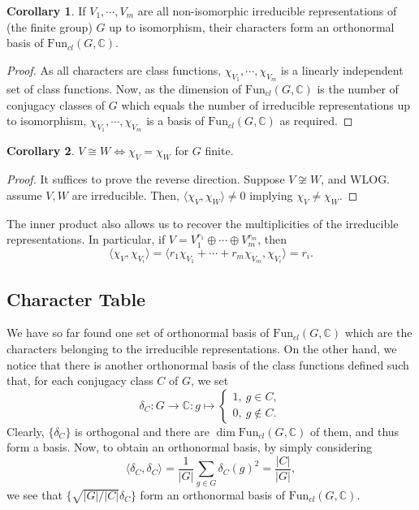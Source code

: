 \documentclass[]{article}
\theoremstyle{definition}
\newtheorem{corollary}{Corollary}[theorem]
\theoremstyle{definition}
\begin{document}
\begin{corollary}
  If \(V_1, \cdots, V_m\) are all non-isomorphic irreducible representations of 
  (the finite group) \(G\) up to isomorphism, their characters form an orthonormal 
  basis of \(\text{Fun}_{cl}(G, \mathbb{C})\).
\end{corollary}
\begin{proof}
  As all characters are class functions, \(\chi_{V_1}, \cdots, \chi_{V_m}\) 
  is a linearly independent set of class functions. Now, as the dimension of 
  \(\text{Fun}_{cl}(G, \mathbb{C})\) is the number of conjugacy classes of 
  \(G\) which equals the number of irreducible representations up to isomorphism, 
  \(\chi_{V_1}, \cdots, \chi_{V_m}\) is a basis of 
  \(\text{Fun}_{cl}(G, \mathbb{C})\) as required.
\end{proof}

\begin{corollary}
  \(V \cong W \iff \chi_V = \chi_W\) for \(G\) finite. 
\end{corollary}
\begin{proof}
  It suffices to prove the reverse direction. Suppose \(V \not\cong W\), and 
  WLOG. assume \(V, W\) are irreducible. Then,  
  \(\langle \chi_V, \chi_W \rangle \neq 0\) implying \(\chi_V \neq \chi_W\).
\end{proof}

The inner product also allows us to recover the multiplicities of the 
irreducible representations. In particular, if \(V = V_1^{r_1} \oplus \cdots \oplus 
V_m^{r_m}\), then 
\[\langle \chi_V, \chi_{V_i} \rangle = 
  \langle r_1\chi_{V_1} + \cdots + r_m \chi_{V_m}, \chi_{V_i} \rangle = r_i.\]

\subsection{Character Table}

We have so far found one set of orthonormal basis of \(\text{Fun}_{cl}(G, \mathbb{C})\)
which are the characters belonging to the irreducible representations. On the other 
hand, we notice that there is another orthonormal basis of the class functions 
defined such that, for each conjugacy class \(C\) of \(G\), we set
\[\delta_C : G \to \mathbb{C} : g \mapsto 
  \begin{cases}
    1, \ g \in C,\\
    0, \ g \not\in C.
  \end{cases}\]
Clearly, \(\{\delta_C\}\) is orthogonal and there are 
\(\dim \text{Fun}_{cl}(G, \mathbb{C})\) of them, and thus form a basis. Now, 
to obtain an orthonormal basis, by simply considering 
\[\langle \delta_C, \delta_C \rangle = 
  \frac{1}{|G|}\sum_{g \in G} \delta_C(g)^2
  = \frac{|C|}{|G|},\]
we see that \(\{\sqrt{|G| / |C|} \delta_C\}\) form an orthonormal basis of 
\(\text{Fun}_{cl}(G, \mathbb{C})\).
\end{document}
